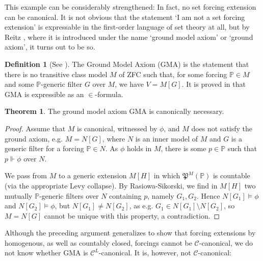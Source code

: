 \documentclass[a4paper,12pt]{amsart}
\theoremstyle{definition}
\newtheorem{thm}[fact]{Theorem}
\newtheorem{defini}[fact]{Definition}
\begin{document}
This example can be considerably strengthened: In fact, no set forcing extension can be canonical. It is not obvious that the statement `I am not a set forcing extension' is expressable in the first-order
language of set theory at all, but by Reitz \cite{R}, where it is introduced under the name `ground model axiom' or `ground axiom', it turns out to be so.

\begin{defini}
[See \cite{R}] The Ground Model Axiom (GMA) is the statement that there is no transitive class model $M$ of ZFC such that, for some forcing $\mathbb{P}\in M$ and some $\mathbb{P}$-generic filter $G$ over $M$,
we have $V=M[G]$. It is proved in \cite{R} that GMA is expressible as an $\in$-formula.
\end{defini}

\begin{thm}{\label{gmacn}}
 The ground model axiom GMA is canonically necessary.
\end{thm}

\begin{proof}
Assume that $M$ is canonical, witnessed by $\phi$, and $M$ does not satisfy the ground axiom, e.g. $M=N[G]$, where $N$ is an inner model of $M$ and
$G$ is a generic filter for a forcing $\mathbb{P}\in N$. As $\phi$ holds in $M$, there is some $p\in\mathbb{P}$ such that $p\Vdash\phi$ over $N$.

We pass from $M$ to a generic extension $M[H]$ in which $\mathfrak{P}^{M}(\mathbb{P})$ is countable (via the appropriate Levy collapse). 
By Rasiowa-Sikorski, we find in $M[H]$ two mutually $\mathbb{P}$-generic filters over $N$ containing $p$, namely $G_{1},G_{2}$. %
Hence $N[G_{1}]\models\phi$ and $N[G_{2}]\models\phi$, but $N[G_{1}]\neq N[G_{2}]$, as e.g. $G_{1}\in N[G_{1}]\setminus N[G_{2}]$, so $M=N[G]$ cannot be unique with this property, a contradiction.


\end{proof}


Although the preceding argument generalizes to show that forcing extensions by homogenous, as well as countably closed, forcings cannot be $\mathcal{C}$-canonical, we do not know whether GMA is $\mathcal{C}^{L}$-canonical. It is, however, not $\mathcal{C}$-canonical:
\end{document}
